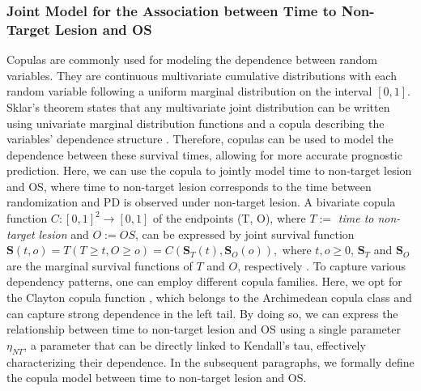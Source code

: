 \subsubsection{Joint Model for the Association between Time to Non-Target Lesion and OS} \label{sec:NT}
Copulas are commonly used for modeling the dependence between random variables. They are continuous multivariate cumulative distributions with each random variable following a uniform marginal distribution on the interval $[0, 1]$.
Sklar's theorem states that any multivariate joint distribution can be written using univariate marginal distribution functions and a copula describing the variables' dependence structure \citep{sklar1959fonctions}. Therefore, copulas can be used to model the dependence between these survival times, allowing for more accurate prognostic prediction.
Here, we can use the copula to jointly model time to non-target lesion and OS, where time to non-target lesion corresponds to the time between randomization and \ac{PD} is observed under non-target lesion. A bivariate copula function $C:[0, 1]^2 \rightarrow [0, 1]$ of the endpoints (T, O), where $T:=$ \textit{time to non-target lesion} and $O:= OS$, can be expressed by joint survival function $\boldsymbol{S}(t, o) = T(T \geq t, O \geq o) = C(\boldsymbol{S}_{T}(t), \boldsymbol{S}_{O}(o)),$
where  $t,o \geq 0$, $\boldsymbol{S}_T$ and $\boldsymbol{S}_O$ are the marginal survival functions of $T$ and $O$, respectively \citep{weber2020statistical}. To capture various dependency patterns, one can employ different copula families. Here, we opt for the Clayton copula function \citep{clayton1978model}, which belongs to the Archimedean copula class and can capture strong dependence in the left tail. By doing so, we can express the relationship between time to non-target lesion and \ac{OS} using a single parameter $\eta_{NT}$, a parameter that can be directly linked to Kendall's tau, effectively characterizing their dependence. In the subsequent paragraphs, we formally define the copula model between time to non-target lesion and OS.

